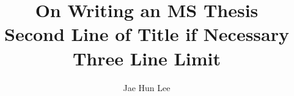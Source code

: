 \documentclass[12pt,oneside]{report}
\begin{document}
\title{On Writing an MS Thesis\\Second Line of Title if Necessary\\Three Line Limit}

\author{Jae Hun Lee}


\showBYUHeader





\cleardoublepage


\appendix


\end{document}
